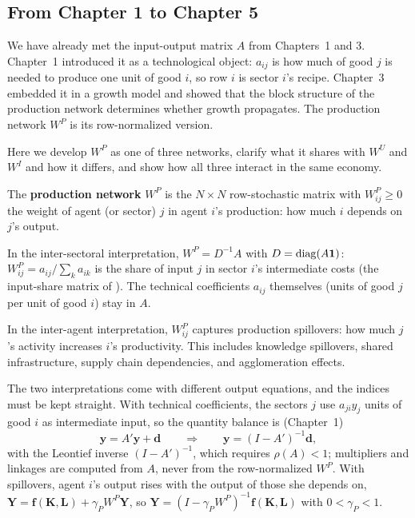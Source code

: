 \documentclass[../structural_economics_book.tex]{subfiles}
\begin{document}
\subsection{From Chapter 1 to Chapter 5}

We have already met the input-output matrix $A$ from Chapters~1 and 3. Chapter~1 introduced it as a technological object: $a_{ij}$ is how much of good $j$ is needed to produce one unit of good $i$, so row $i$ is sector $i$'s recipe. Chapter~3 embedded it in a growth model and showed that the block structure of the production network determines whether growth propagates. The production network $W^P$ is its row-normalized version.

Here we develop $W^P$ as one of three networks, clarify what it shares with $W^U$ and $W^I$ and how it differs, and show how all three interact in the same economy.

\begin{definition}\label{ch05:def:WP}
The \textbf{production network} $W^P$ is the $N \times N$ row-stochastic matrix with $W^P_{ij} \geq 0$ the weight of agent (or sector) $j$ in agent $i$'s production: how much $i$ depends on $j$'s output.

In the inter-sectoral interpretation, $W^P = D^{-1}A$ with $D = \operatorname{diag}(A\mathbf{1})$: $W^P_{ij} = a_{ij}/\sum_k a_{ik}$ is the share of input $j$ in sector $i$'s intermediate costs (the input-share matrix of \citealt{acemoglu2012network}). The technical coefficients $a_{ij}$ themselves (units of good $j$ per unit of good $i$) stay in $A$.

In the inter-agent interpretation, $W^P_{ij}$ captures production spillovers: how much $j$'s activity increases $i$'s productivity. This includes knowledge spillovers, shared infrastructure, supply chain dependencies, and agglomeration effects.
\end{definition}

The two interpretations come with different output equations, and the indices must be kept straight. With technical coefficients, the sectors $j$ use $a_{ji}y_j$ units of good $i$ as intermediate input, so the quantity balance is (Chapter~1)
\begin{equation}\label{ch05:eq:output_WP}
\mathbf{y} = A'\mathbf{y} + \mathbf{d} \qquad \Rightarrow \qquad \mathbf{y} = (I - A')^{-1}\mathbf{d},
\end{equation}
with the Leontief inverse $(I - A')^{-1}$, which requires $\rho(A) < 1$; multipliers and linkages are computed from $A$, never from the row-normalized $W^P$. With spillovers, agent $i$'s output rises with the output of those she depends on, $\mathbf{Y} = \mathbf{f}(\mathbf{K}, \mathbf{L}) + \gamma_P W^P \mathbf{Y}$, so $\mathbf{Y} = (I - \gamma_P W^P)^{-1}\mathbf{f}(\mathbf{K}, \mathbf{L})$ with $0 < \gamma_P < 1$.
\end{document}
